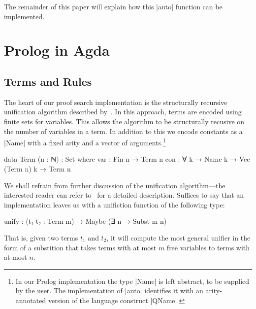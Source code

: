 \documentclass[preprint]{sigplanconf}
\begin{document}
The remainder of this paper will explain how this |auto| function can
be implemented.

\section{Prolog in Agda}
\label{sec:prolog}

\subsection{Terms and Rules}

The heart of our proof search implementation is the structurally recursive
unification algorithm described by~\citet{mcbride}. In this approach, terms
are encoded using finite sets for variables. This allows the algorithm to
be structurally recusive on the number of variables in a term. In addition
to this we encode constants as a |Name| with a fixed arity and a vector of
arguments.\footnote{
  In our Prolog implementation the type |Name| is left abstract, to be
  supplied by the user. The implementation of |auto| identifies it with
  an arity-annotated version of the language construct |QName|.
}


\begin{code}
  data Term (n : ℕ) : Set where
    var  : Fin n → Term n
    con  : ∀ {k} → Name k → Vec (Term n) k → Term n
\end{code}




We shall refrain from further discussion of the unification algorithm---the
interested reader can refer to~\cite{mcbride} for a detailed description.
Suffices to say that an implementation leaves us with a unifiction function
of the following type:

\begin{spec}
  unify : (t₁ t₂ : Term m) → Maybe (∃ n → Subst m n)
\end{spec}

That is, given two terms $t_1$ and $t_2$, it will compute the most general
unifier in the form of a substition that takes terms with at most $m$ free
variables to terms with at most $n$. 
\end{document}
